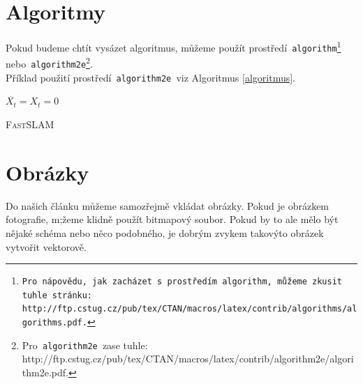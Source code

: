 \documentclass[a4paper,11pt]{article}
\begin{document}
\section{Algoritmy}\label{sekce3}
Pokud budeme chtít vysázet algoritmus, můžeme použít prostředí\texttt{ algorithm\footnote{Pro\,nápovědu,\,jak\,zacházet\,s~prostředím\texttt{ algorithm, }můžeme\,zkusit\,tuhle\,stránku:\\ http://ftp.cstug.cz/pub/tex/CTAN/macros/latex/contrib/algorithms/algorithms.pdf.} } nebo\texttt{ algorithm2e}\footnote{Pro\texttt{ algorithm2e }zase tuhle: http://ftp.cstug.cz/pub/tex/CTAN/macros/latex/contrib/algorithm2e/algorithm2e.pdf.}.\\
Příklad použití prostředí\texttt{ algorithm2e }viz Algoritmus \ref{algoritmus}.
\newpage
\vspace*{-0.15cm}
\IncMargin{1.2em}
\begin{algorithm}
  \SetAlgoNoLine
  \SetNlSkip{0em}
\Indm  
\Indp
\Indp
  \BlankLine
  $\overline{X_t} = X_t = 0$ \BlankLine   
  
        
\caption{\textsc{Fast}SLAM\label{algoritmus}}
\end{algorithm}
\DecMargin{1.2em}

\section{Obrázky}
Do našich článku můžeme samozřejmě vkládat obrázky. Pokud je obrázkem fotografie, m;žeme klidně použít bitmapový soubor. Pokud by to ale mělo být nějaké schéma nebo něco podobného, je dobrým zvykem takovýto obrázek vytvořit vektorově.
\end{document}
